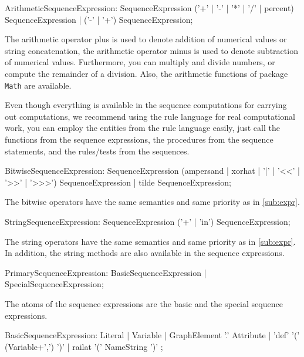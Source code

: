 \begin{rail}
  ArithmeticSequenceExpression:
    SequenceExpression ('+' | '-' | '*' | '/' | percent) SequenceExpression |
		('-' | '+') SequenceExpression;
\end{rail}

The arithmetic operator plus is used to denote addition of numerical values or string concatenation,
the arithmetic operator minus is used to denote subtraction of numerical values.
Furthermore, you can multiply and divide numbers, or compute the remainder of a division.
Also, the arithmetic functions of package \texttt{Math} are available.

Even though everything is available in the sequence computations for carrying out computations, we recommend using the rule language for real computational work, you can employ the entities from the rule language easily, just call the functions from the sequence expressions, the procedures from the sequence statements, and the rules/tests from the sequences.

\begin{rail}
  BitwiseSequenceExpression: 
    SequenceExpression (ampersand | xorhat | '|' | '<<' | '>>' | '>>>') SequenceExpression |
    tilde SequenceExpression;
\end{rail}

The bitwise operators have the same semantics and same priority as in \ref{sub:expr}.

\begin{rail}
  StringSequenceExpression: 
    SequenceExpression ('+' | 'in') SequenceExpression;
\end{rail}

The string operators have the same semantics and same priority as in \ref{sub:expr}.
In addition, the string methods are also available in the sequence expressions.

\begin{rail}
  PrimarySequenceExpression:
    BasicSequenceExpression |
    SpecialSequenceExpression;
\end{rail}

The atoms of the sequence expressions are the basic and the special sequence expressions.

\begin{rail}
  BasicSequenceExpression:
    Literal |
    Variable | 
    GraphElement '.' Attribute |
    'def' '(' (Variable+',') ')' |
    railat '(' NameString ')'
  ;
\end{rail}

